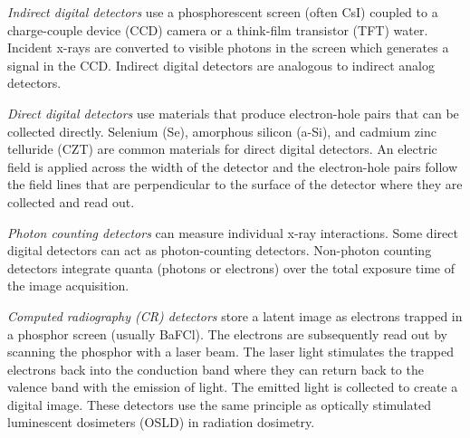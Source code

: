 \documentclass[mphy386-notes.tex]{subfiles}
\begin{document}
\textit{Indirect digital detectors} use a phosphorescent screen (often CsI)
coupled to a charge-couple device (CCD) camera or a think-film transistor (TFT)
water. Incident x-rays are converted to visible photons in the screen which
generates a signal in the CCD. Indirect digital detectors are analogous to
indirect analog detectors.

\textit{Direct digital detectors} use materials that produce electron-hole pairs
that can be collected directly. Selenium (Se), amorphous silicon (a-Si), and
cadmium zinc telluride (CZT) are common materials for direct digital detectors.
An electric field is applied across the width of the detector and the
electron-hole pairs follow the field lines that are perpendicular to the surface
of the detector where they are collected and read out.

\textit{Photon counting detectors} can measure individual x-ray interactions.
Some direct digital detectors can act as photon-counting detectors. Non-photon
counting detectors integrate quanta (photons or electrons) over the total
exposure time of the image acquisition.

\textit{Computed radiography (CR) detectors} store a latent image as electrons
trapped in a phosphor screen (usually BaFCl). The electrons are subsequently
read out by scanning the phosphor with a laser beam. The laser light stimulates
the trapped electrons back into the conduction band where they can return back
to the valence band with the emission of light. The emitted light is collected
to create a digital image. These detectors use the same principle as optically
stimulated luminescent dosimeters (OSLD) in radiation dosimetry.









\end{document}
